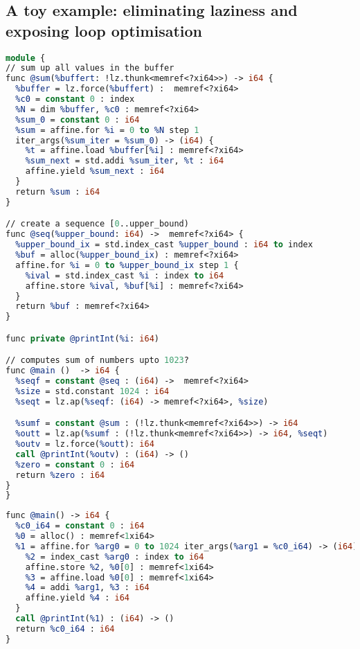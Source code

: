 \documentclass[sigplan,\review anonymous]{acmart}
\begin{document}
{\subsection{A toy example: eliminating laziness and exposing loop optimisation}

\begin{lstlisting}[language=llvm, caption="example of laziness with tensor computations"]
module {
// sum up all values in the buffer
func @sum(%buffert: !lz.thunk<memref<?xi64>>) -> i64 {
  %buffer = lz.force(%buffert) :  memref<?xi64>
  %c0 = constant 0 : index
  %N = dim %buffer, %c0 : memref<?xi64>
  %sum_0 = constant 0 : i64
  %sum = affine.for %i = 0 to %N step 1
  iter_args(%sum_iter = %sum_0) -> (i64) {
    %t = affine.load %buffer[%i] : memref<?xi64>
    %sum_next = std.addi %sum_iter, %t : i64
    affine.yield %sum_next : i64
  }
  return %sum : i64
}

// create a sequence [0..upper_bound)
func @seq(%upper_bound: i64) ->  memref<?xi64> {
  %upper_bound_ix = std.index_cast %upper_bound : i64 to index
  %buf = alloc(%upper_bound_ix) : memref<?xi64>
  affine.for %i = 0 to %upper_bound_ix step 1 {
    %ival = std.index_cast %i : index to i64
    affine.store %ival, %buf[%i] : memref<?xi64>
  }
  return %buf : memref<?xi64>
}

func private @printInt(%i: i64)

// computes sum of numbers upto 1023?
func @main ()  -> i64 {
  %seqf = constant @seq : (i64) ->  memref<?xi64>
  %size = std.constant 1024 : i64
  %seqt = lz.ap(%seqf: (i64) -> memref<?xi64>, %size)

  %sumf = constant @sum : (!lz.thunk<memref<?xi64>>) -> i64
  %outt = lz.ap(%sumf : (!lz.thunk<memref<?xi64>>) -> i64, %seqt)
  %outv = lz.force(%outt): i64
  call @printInt(%outv) : (i64) -> ()
  %zero = constant 0 : i64
  return %zero : i64
}
}
\end{lstlisting}

\begin{lstlisting}[language=llvm, caption="final program after eliminating laziness and loop fusion"]
func @main() -> i64 {
  %c0_i64 = constant 0 : i64
  %0 = alloc() : memref<1xi64>
  %1 = affine.for %arg0 = 0 to 1024 iter_args(%arg1 = %c0_i64) -> (i64) {
    %2 = index_cast %arg0 : index to i64
    affine.store %2, %0[0] : memref<1xi64>
    %3 = affine.load %0[0] : memref<1xi64>
    %4 = addi %arg1, %3 : i64
    affine.yield %4 : i64
  }
  call @printInt(%1) : (i64) -> ()
  return %c0_i64 : i64
}
\end{lstlisting}


}
\end{document}
